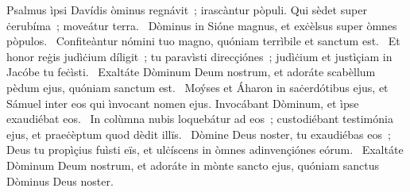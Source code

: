 { Psalmus ìpsi Davídis}
{%
òminus regnávit~; irascàntur pòpuli. Qui sèdet super ċerubíma~; moveátur terra. 
~Dòminus in Sióne magnus, et exċèlsus super òmnes pòpulos. 
~Confiteàntur nómini tuo magno, quóniam terrìbile et sanctum est. 
~Et honor reġis judìċium díligit~; tu paravìsti direcçiónes~; judìċium et justìçiam in Jacóbe tu feċìsti. 
~Exaltáte Dòminum Deum nostrum, et adoráte scabèllum pèdum ejus, quóniam sanctum est. 
~Moýses et Áharon in saċerdótibus ejus, et Sámuel inter eos qui ìnvocant nomen ejus. Invocábant Dòminum, et ìpse exaudiébat eos. 
~In colùmna nubis loquebátur ad eos~; custodiébant testimónia ejus, et praeċèptum quod dèdit illïs. 
~Dòmine Deus noster, tu exaudiébas eos~; Deus tu propìçius fuìsti eïs, et ulċíscens in òmnes adinvençiónes eórum. 
~Exaltáte Dòminum Deum nostrum, et adoráte in mònte sancto ejus, quóniam sanctus Dòminus Deus noster. 
}
